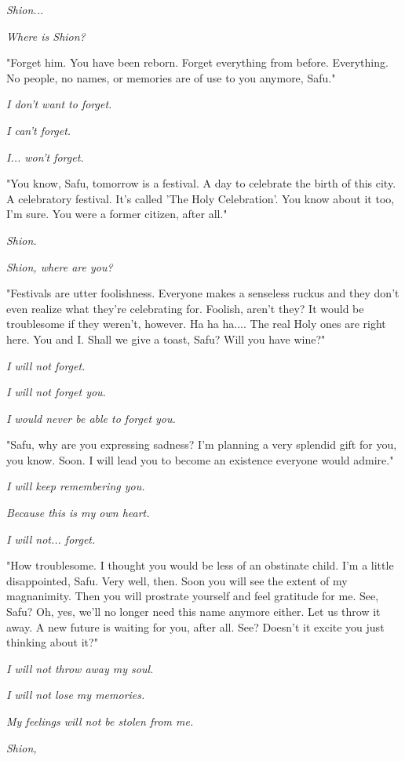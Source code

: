 \emph{Shion...}

\emph{Where is Shion?}

"Forget him. You have been reborn. Forget everything from before.
Everything. No people, no names, or memories are of use to you anymore,
Safu."

\emph{I don't want to forget.}

\emph{I can't forget.}

\emph{I... won't forget.}

"You know, Safu, tomorrow is a festival. A day to celebrate the birth of
this city. A celebratory festival. It's called 'The Holy Celebration'.
You know about it too, I'm sure. You were a former citizen, after all."

\emph{Shion.}

\emph{Shion, where are you?}

"Festivals are utter foolishness. Everyone makes a senseless ruckus and
they don't even realize what they're celebrating for. Foolish, aren't
they? It would be troublesome if they weren't, however. Ha ha ha.... The
real Holy ones are right here. You and I. Shall we give a toast, Safu?
Will you have wine?"

\emph{I will not forget.}

\emph{I will not forget you.}

\emph{I would never be able to forget you.}

"Safu, why are you expressing sadness? I'm planning a very splendid gift
for you, you know. Soon. I will lead you to become an existence everyone
would admire."

\emph{I will keep remembering you.}

\emph{Because this is my own heart.}

\emph{I will not... forget.}

"How troublesome. I thought you would be less of an obstinate child. I'm
a little disappointed, Safu. Very well, then. Soon you will see the
extent of my magnanimity. Then you will prostrate yourself and feel
gratitude for me. See, Safu? Oh, yes, we'll no longer need this name
anymore either. Let us throw it away. A new future is waiting for you,
after all. See? Doesn't it excite you just thinking about it?"

\emph{I will not throw away my soul.}

\emph{I will not lose my memories.}

\emph{My feelings will not be stolen from me.}

\emph{Shion,}

